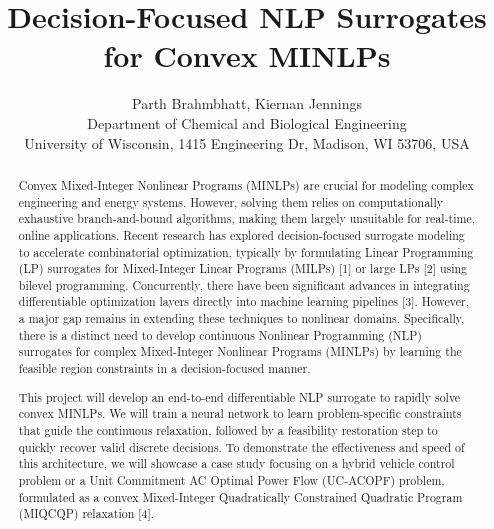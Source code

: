\documentclass[11pt,twoside]{article}
\begin{document}
	
\title{Decision-Focused NLP Surrogates for Convex MINLPs}

\author{Parth Brahmbhatt, Kiernan Jennings\\
	{\small Department of Chemical and Biological Engineering}\\
	{\small \;University of Wisconsin, 1415 Engineering Dr, Madison, WI 53706, USA}}
\date{}
\maketitle
	
	
\begin{abstract}	
	Convex Mixed-Integer Nonlinear Programs (MINLPs) are crucial for modeling complex engineering and energy systems. However, solving them relies on computationally exhaustive branch-and-bound algorithms, making them largely unsuitable for real-time, online applications. Recent research has explored decision-focused surrogate modeling to accelerate combinatorial optimization, typically by formulating Linear Programming (LP) surrogates for Mixed-Integer Linear Programs (MILPs) [1] or large LPs [2] using bilevel programming. Concurrently, there have been significant advances in integrating differentiable optimization layers directly into machine learning pipelines [3]. However, a major gap remains in extending these techniques to nonlinear domains. Specifically, there is a distinct need to develop continuous Nonlinear Programming (NLP) surrogates for complex Mixed-Integer Nonlinear Programs (MINLPs) by learning the feasible region constraints in a decision-focused manner.
	
	This project will develop an end-to-end differentiable NLP surrogate to rapidly solve convex MINLPs. We will train a neural network to learn problem-specific constraints that guide the continuous relaxation, followed by a feasibility restoration step to quickly recover valid discrete decisions. To demonstrate the effectiveness and speed of this architecture, we will showcase a case study focusing on a hybrid vehicle control problem or a Unit Commitment AC Optimal Power Flow (UC-ACOPF) problem, formulated as a convex Mixed-Integer Quadratically Constrained Quadratic Program (MIQCQP) relaxation [4].
	
%	
%	
%	
	
\end{abstract}
	
\end{document}
